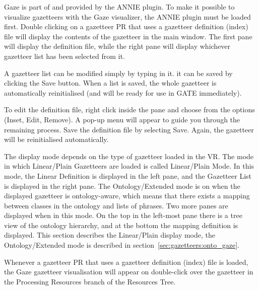 Gaze is part of and provided by the ANNIE plugin. To make it possible
to visualize gazetteers with the Gaze visualizer, the ANNIE plugin must
be loaded first.
Double clicking on a gazetteer PR that uses a gazetteer definition (index)
file  will display
the contents of the gazetteer in the main window. The first pane will
display the definition file, while the right pane will display
whichever gazetteer list has been selected from it.

A gazetteer list can be modified simply by typing in it. it can be
saved by clicking the Save button. When a list is saved, the whole
gazetteer is automatically reinitialised (and will be ready for use in
GATE immediately).

To edit the definition file, right click inside the pane and choose
from the options (Inset, Edit, Remove). A pop-up menu will appear to
guide you through the remaining process. Save the definition file by
selecting Save. Again, the gazetteer will be reinitialised
automatically.


 The display mode depends on the type of gazetteer loaded in the VR. The mode in
 which Linear/Plain Gazetteers are loaded is called Linear/Plain Mode. In
 this mode, the Linear Definition is displayed in the left pane, and the
 Gazetteer List is displayed in the right pane. The Ontology/Extended
 mode is on when the displayed gazetteer is ontology-aware, which means that
 there exists a mapping between classes in the ontology and lists of phrases.
 Two more panes are displayed when in this mode. On the top in the left-most
 pane there is a tree view of the ontology hierarchy, and at the bottom the
 mapping definition is displayed. This section describes the Linear/Plain
 display mode, the Ontology/Extended mode is described in 
 section~\ref{sec:gazetteers:onto_gaze}.
	
Whenever a gazetteer PR that uses a gazetteer definition (index) file is loaded, 
the Gaze gazetteer visualisation  will
appear on double-click over the gazetteer in the Processing Resources branch of
the Resources Tree.


